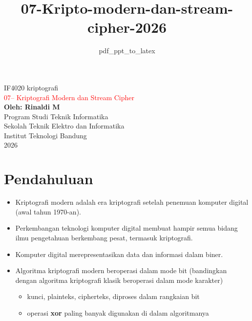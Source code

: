 \documentclass{article}
\title{07-Kripto-modern-dan-stream-cipher-2026}
\author{pdf\_ppt\_to\_latex}
\date{}
\begin{document}

\begin{center}
{\huge IF4020 kriptografi} \\
\vspace{10mm}
{\Huge \textcolor{red}{07-- Kriptografi Modern dan Stream Cipher}} \\
\vspace{20mm}
\textbf{Oleh: Rinaldi M} \\
\vspace{10mm}
Program Studi Teknik Informatika \\
Sekolah Teknik Elektro dan Informatika \\
Institut Teknologi Bandung \\
2026
\end{center}

\newpage


\section*{Pendahuluan}

\begin{itemize}
    \item Kriptografi modern adalah era kriptografi setelah penemuan komputer digital (awal tahun 1970-an).
    \item Perkembangan teknologi komputer digital membuat hampir semua bidang ilmu pengetahuan berkembang pesat, termasuk kriptografi.
    \item Komputer digital merepresentasikan data dan informasi dalam biner.
    \item Algoritma kriptografi modern beroperasi dalam mode bit (bandingkan dengan algoritma kriptografi klasik beroperasi dalam mode karakter)
    \begin{itemize}
        \item kunci, plainteks, cipherteks, diproses dalam rangkaian bit
        \item operasi \textbf{xor} paling banyak digunakan di dalam algoritmanya
    \end{itemize}
\end{itemize}

\newpage

\end{document}
